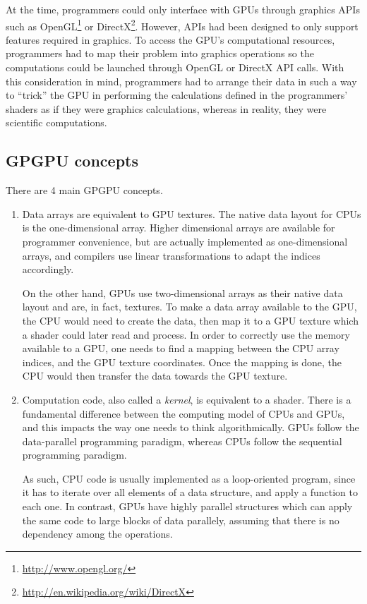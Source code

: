 \documentclass[12pt, a4paper]{report}
\begin{document}
\begin{sloppypar}
At the time, programmers could only interface with GPUs through graphics APIs
such as OpenGL\footnote{\url{http://www.opengl.org/}} or DirectX\footnote{\url{http://en.wikipedia.org/wiki/DirectX}}.
However, APIs had been designed to only support features required in graphics.
To access the GPU's computational resources, programmers had to map their
problem into graphics operations so the computations could be launched through
OpenGL or DirectX API calls.
With this consideration in mind, programmers had to arrange their data in such a
way to ``trick'' the GPU in performing the calculations defined in the
programmers' shaders as if they were graphics calculations, whereas in reality,
they were scientific computations.

\subsection{GPGPU concepts}
There are 4 main GPGPU concepts.

\begin{enumerate}
\item Data arrays are equivalent to GPU textures.
The native data layout for CPUs is the one-dimensional array.
Higher dimensional arrays are available for programmer convenience, but are
actually implemented as one-dimensional arrays, and compilers use linear
transformations to adapt the indices accordingly.

On the other hand, GPUs use two-dimensional arrays as their native data layout
and are, in fact, textures.
To make a data array available to the GPU, the CPU would need to create the
data, then map it to a GPU texture which a shader could later read and process.
In order to correctly use the memory available to a GPU, one needs to find a
mapping between the CPU array indices, and the GPU texture coordinates.
Once the mapping is done, the CPU would then transfer the data towards the GPU
texture.

\item Computation code, also called a \emph{kernel}, is equivalent to a shader.
There is a fundamental difference between the computing model of CPUs and GPUs,
and this impacts the way one needs to think algorithmically.
GPUs follow the data-parallel programming paradigm, whereas CPUs follow the
sequential programming paradigm.

As such, CPU code is usually implemented as a loop-oriented program, since it
has to iterate over all elements of a data structure, and apply a function to
each one.
In contrast, GPUs have highly parallel structures which can apply the same code
to large blocks of data parallely, assuming that there is no dependency among
the operations.


\end{enumerate}
\end{sloppypar}
\end{document}
